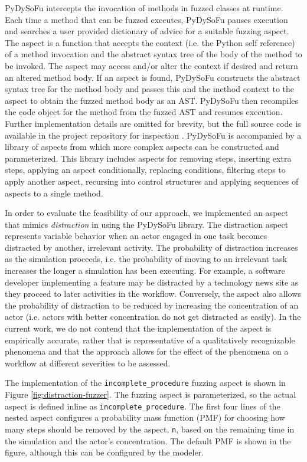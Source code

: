 \documentclass{llncs}
\begin{document}
PyDySoFu intercepts the invocation of methods in fuzzed classes at runtime.  Each time a method that can be fuzzed
executes, PyDySoFu pauses execution and searches a user provided dictionary of advice for a suitable fuzzing aspect. The
aspect is a function that accepts the context (i.e. the Python self reference) of a method invocation and the abstract
syntax tree of the body of the method to be invoked.  The aspect may access and/or alter the context if desired and
return an altered method body.  If an aspect is found, PyDySoFu constructs the abstract syntax tree for the method body
and passes this and the method context to the aspect to obtain the fuzzed method body as an AST.  PyDySoFu then
recompiles the code object for the method from the fuzzed AST and resumes execution.  Further implementation details are
omitted for brevity, but the full source code is available in the project repository for inspection
\cite{storer2016pydysofu-scm}. PyDySoFu is accompanied by a library of aspects from which more complex aspects can be
constructed and parameterized.  This library includes aspects for removing steps, inserting extra steps, applying an
aspect conditionally, replacing conditions, filtering steps to apply another aspect, recursing into control structures
and applying sequences of aspects to a single method.

In order to evaluate the feasibility of our approach, we implemented an aspect that mimics \emph{distraction} in using
the PyDySoFu library.  The distraction aspect represents variable behavior when an actor engaged in one task becomes
distracted by another, irrelevant activity.  The probability of distraction increases as the simulation proceeds,
i.e. the probability of moving to an irrelevant task increases the longer a simulation has been executing.  For example,
a software developer implementing a feature may be distracted by a technology news site as they proceed to later
activities in the workflow.  Conversely, the aspect also allows the probability of distraction to be reduced by
increasing the concentration of an actor (i.e. actors with better concentration do not get distracted as easily).  In
the current work, we do not contend that the implementation of the aspect is empirically accurate, rather that is
representative of a qualitatively recognizable phenomena and that the approach allows for the effect of the phenomena on
a workflow at different severities to be assessed.

The implementation of the \lstinline!incomplete_procedure! fuzzing aspect is shown in Figure
\ref{fig:distraction-fuzzer}.  The fuzzing aspect is parameterized, so the actual aspect is defined inline as
\lstinline!incomplete_procedure!.  The first four lines of the nested aspect configures a probability mass function
(PMF) for choosing how many steps should be removed by the aspect, \lstinline!n!, based on the remaining time in the
simulation and the actor's concentration. The default PMF is shown in the figure, although this can be configured by the
modeler.
\end{document}
